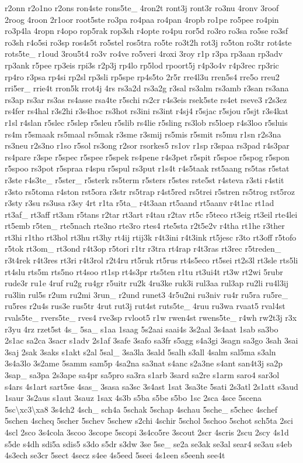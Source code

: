 \begin{DoxyCompactItemize}
r2onn r2o1no r2ons ron4ste rons5te\-\_\- 4ron2t ront3j ront3r ro3nu 4ronv 3roof 2roog 4roon 2r1oor root5ste ro3pa ro4paa ro4pan 4ropb ro1pe ro5pee ro4pin ro3p4la 4ropn r4opo rop5rak rop3sh r4opte ro4pu ror5d ro3ro ro3sa ro5se ro3sf ro3sh r4o5si ro3sp ros4s5t ro5stel ros5tra ro5te ro3t2h rot3j ro5ton ro3tr rot4ste rots5te\-\_\- r1oud 3rou5t4 ro3v ro4ve ro5veri 4roxi 3roy r1p r3pa rp3aan rp3adv rp3ank r5pee rp3eis rpi3s r2p3j rp4lo rp5lod rpoort5j r4p3o4v r4p3rec rp3ric rp4ro r3psa rp4si rp2sl rp3sli rp5spe rp4s5to 2r5r rre4l3u rren5s4 rre5o rreu2 rri5er\-\_\- rrie4t rron5k rrot4j 4rs rs3a2d rs3a2g r3sal rs3alm rs3amb r3san rs3ana rs3ap rs3ar rs3as rs4asse rsa4te r5schi rs2cr r4s3eis rsek5ste rs4et rseve3 r2s3ez rs4fer rs4hal r3s2hi r3s4hoc rs3hot rs3ini rs3int r4sj4 r5sjac r5sjou r5sjt r3s4kat r1sl r4slan r5slec r5slep r5sleu r5slib rs4lie r5sling rs3lob rs5loep r4s3loo r5sluis rs4m r5smaak rs5maal rs5mak r3sme r3smij rs5mis r5smit rs5mu r1sn r2s3na rs3neu r2s3no r1so r5sol rs3ong r2sor rsorkes5 rs1ov r1sp r3spaa rs3pad r4s3par rs4pare r3spe r5spec r5spee r5spek rs4pene r4s3pet r5spit r5spoe r5spog r5spon r5spoo rs3pot r5spraa r4spu r5spul rs3put r1s4t r4s5taak rst5aang rs5tas r5stat r3ste r4s3te\-\_\- r5ster\-\_\- r5sterk rs5term r5sters r5stes rste5st r4steva r3sti r4stit r3sto rs5toma r4ston rst5ora r3str rs5trap r4st5red rs5trei r5stren rs5trog rst5roz r3sty r3su rs3usa r3sy 4rt r1ta r5ta\-\_\- r4t3aan rt5aand rt5aanv r4t1ac rt1ad rt3af\-\_\- rt3aff rt3am r5tans r2tar rt3art r4tau r2tav rt5c r5teco rt3eig rt3eil rte4lei rt5emb r5ten\-\_\- rte5nach rte3no rte3ro rtes4 rte5sta r2t5e2v r4tha rt1he r3ther rt3hi r1tho rt3hol rt3hu rt3hy rt4ij rtij3k r4t3ini r4t3ink rt5jesc r3to rt3off r5tofo r5tok rt3om\-\_\- rt3ond r4t3op r5tori r1tr r3tra rt4rap r4t3ras rt3rec r5treden\-\_\- r3t4rek r4t3res rt3ri r4t3rol r2t4ru rt5ruk rt5rus rt4s5eco rt5sei rt2s3l rt3sle rts5li rt4slu rts5m rts5no rt4soo rt1sp rt4s3pr rts5ten r1tu rt3ui4t rt3w rt2wi 5rubr rude3r ru1e 4ruf ru2g ru4gr r5uitr ru2k 4ru3ke ruk3i rul3aa rul3ap ru2li ru4l3ij ru3lin rul5s r2um ru2mi 3run\-\_\- r2und runet3 4r5u2ni ru3niv ru4r ru5ra ru5re\-\_\- ru5res r2u4s rus3e rus5tr 4rut rut3j rut4st ruts5te\-\_\- 4ruu ru3wa rvaat5 rval4st rvals5te\-\_\- rvers5te\-\_\- rves4 rve3sp rvloot5 r1w rwen4st rwens5te\-\_\- r4wh rw2t3j r3x r3yu 4rz rzet5st 4s\-\_\- 5sa\-\_\- s1aa 1saag 5s2aai saai4s 3s2aal 3s4aat 1sab sa3bo 2s1ac sa2ca 3sacr s1adv 2s1af 3safe 3safo sa3fr s5agg s4a3gi 3sagn sa3go 3sah 3sai 3saj 2sak 3saks s1akt s2al 5sal\-\_\- 3sa3la 3sald 5salh s3all 4salm sal5ma s3aln 3s4a3lo 3s2ame 5samm sam5p 4sa2na sa3nat s4anc s2a3ne s4ant san4t3j sa2p 3sap\-\_\- sa3pa 2s3ape sa4pr sa5pro sa3ra s1arb 3sard sa2re s1arm saro4 sar3ol s4ars 4s1art sart5se 4sas\-\_\- 3sasa sa3sc 3s4ast 1sat 3sa3te 5sati 2s3atl 2s1att s3aud 1saur 3s2aus s1aut 3sauz 1sax 4s3b s5ba s5be s5bo 1sc 2sca 4sce 5scena 5sc\textbackslash{}xc3\textbackslash{}xa8 3s4ch2 4sch\-\_\- sch4a 5schak 5schap 4schau 5sche\-\_\- s5chec 4schef 5schen 4scheq 5scher 5schev 5schew s2chi 4schir 5schol 5schoo 5schot sch5ta 2sci 4scl 2sco 3s4cola 3scoo 3scope 5scopi 3s4co5re 3scout 2scr 4scris 2scu 2scy 4s1d s5de s4dh sdi5a sdis5 s3do s5dr s3dw 3se 5se\-\_\- se2a se3ak se3al sear4 se3au s4eb 4s3ech se3cr 5sect 4secz s4ee 4s5eed 5seei 4s1een s5eenh see4t 
\end{DoxyCompactItemize}
